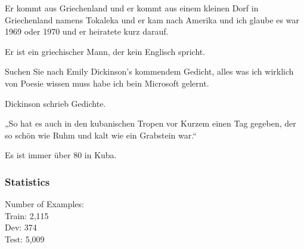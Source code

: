 \begin{examples}
  \item \label{itm:xnli1} Er kommt aus Griechenland und er kommt aus einem kleinen Dorf in Griechenland namens Tokaleka und er kam nach Amerika und ich glaube es war 1969 oder 1970 und er heiratete kurz darauf.

        Er ist ein griechischer Mann, der kein Englisch spricht.
  \item \label{itm:xnli2} Suchen Sie nach Emily Dickinson's kommendem Gedicht, alles was ich wirklich von Poesie wissen muss habe ich bein Microsoft gelernt.

        Dickinson schrieb Gedichte.
  \item \label{itm:xnli3} „So hat es auch in den kubanischen Tropen vor Kurzem einen Tag gegeben, der so schön wie Ruhm und kalt wie ein Grabstein war.“

        Es ist immer über 80 in Kuba.
\end{examples}

\subsubsection{Statistics}

Number of Examples: \\
Train: 2,115 \\
Dev: 374 \\
Test: 5,009







